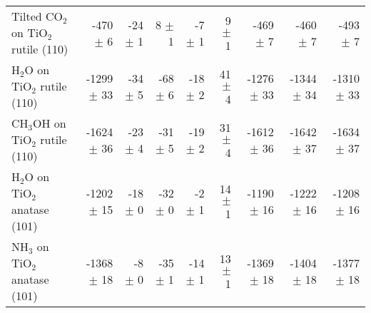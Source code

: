 \begin{table}
\begin{adjustbox}{center,max width=0.9\textwidth}
\begin{tabular}{lrrrrrrrr}
Tilted CO$_2$ on TiO$_2$ rutile (110) & -470 $\pm$ 6 & -24 $\pm$ 1 & 8 $\pm$ 1 & -7 $\pm$ 1 & 9 $\pm$ 1 & -469 $\pm$ 7 & -460 $\pm$ 7 & -493 $\pm$ 7 \\
H$_2$O on TiO$_2$ rutile (110) & -1299 $\pm$ 33 & -34 $\pm$ 5 & -68 $\pm$ 6 & -18 $\pm$ 2 & 41 $\pm$ 4 & -1276 $\pm$ 33 & -1344 $\pm$ 34 & -1310 $\pm$ 33 \\
CH$_3$OH on TiO$_2$ rutile (110) & -1624 $\pm$ 36 & -23 $\pm$ 4 & -31 $\pm$ 5 & -19 $\pm$ 2 & 31 $\pm$ 4 & -1612 $\pm$ 36 & -1642 $\pm$ 37 & -1634 $\pm$ 37 \\
H$_2$O on TiO$_2$ anatase (101) & -1202 $\pm$ 15 & -18 $\pm$ 0 & -32 $\pm$ 0 & -2 $\pm$ 1 & 14 $\pm$ 1 & -1190 $\pm$ 16 & -1222 $\pm$ 16 & -1208 $\pm$ 16 \\
NH$_3$ on TiO$_2$ anatase (101) & -1368 $\pm$ 18 & -8 $\pm$ 0 & -35 $\pm$ 1 & -14 $\pm$ 1 & 13 $\pm$ 1 & -1369 $\pm$ 18 & -1404 $\pm$ 18 & -1377 $\pm$ 18 \\
\bottomrule
\end{tabular}
\end{adjustbox}
\end{table}